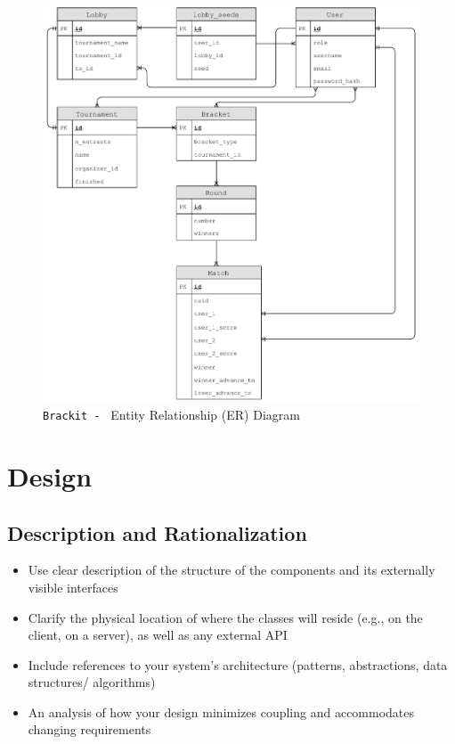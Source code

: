 \documentclass{article}
\begin{document}
\begin{center}
    \begin{figure}[h]
        \centering
        \includegraphics[width=19cm]{../diagrams/er.pdf}
        \caption{\texttt{Brackit - } Entity Relationship (ER) Diagram}
        \end{figure}
\end{center}
\clearpage
\section{Design}
\subsection{Description and Rationalization}
\begin{itemize}
    \item{Use clear description of the structure of the components and its externally visible interfaces}
    \item{Clarify the physical location of where the classes will reside (e.g., on the client, on a server),
    as well as any external API}
    \item{Include references to your system’s architecture (patterns, abstractions, data structures/
    algorithms)}
    \item{An analysis of how your design minimizes coupling and accommodates changing requirements}
\end{itemize}
\clearpage
\end{document}
